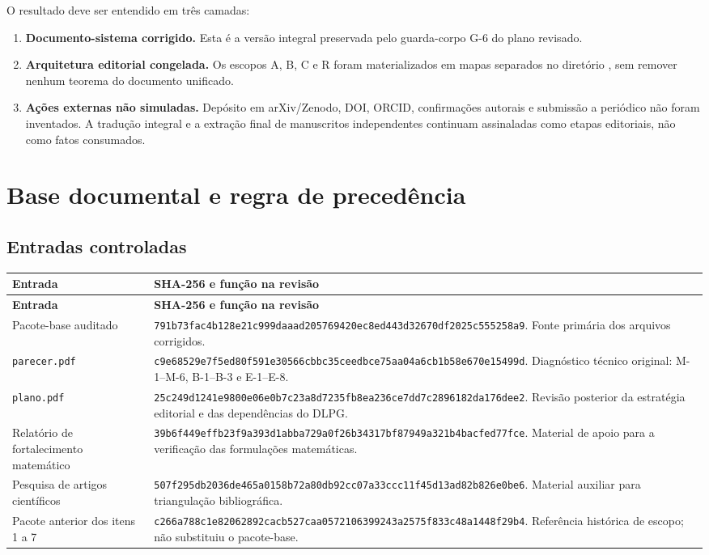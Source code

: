 \documentclass[11pt,a4paper]{article}
\begin{document}
O resultado deve ser entendido em três camadas:

\begin{enumerate}
  \item \textbf{Documento-sistema corrigido.} Esta é a versão integral preservada pelo
  guarda-corpo G-6 do plano revisado.
  \item \textbf{Arquitetura editorial congelada.} Os escopos A, B, C e R foram
  materializados em mapas separados no diretório , sem remover nenhum
  teorema do documento unificado.
  \item \textbf{Ações externas não simuladas.} Depósito em arXiv/Zenodo, DOI, ORCID,
  confirmações autorais e submissão a periódico não foram inventados. A tradução integral e
  a extração final de manuscritos independentes continuam assinaladas como etapas
  editoriais, não como fatos consumados.
\end{enumerate}

\section{Base documental e regra de precedência}

\subsection{Entradas controladas}

\begin{longtable}{L{0.29\textwidth}L{0.58\textwidth}}
\toprule
\textbf{Entrada} & \textbf{SHA-256 e função na revisão}\\
\midrule
\endfirsthead
\toprule
\textbf{Entrada} & \textbf{SHA-256 e função na revisão}\\
\midrule
\endhead
Pacote-base auditado &
\nolinkurl{791b73fac4b128e21c999daaad205769420ec8ed443d32670df2025c555258a9}. Fonte
primária dos arquivos corrigidos.\\
\texttt{parecer.pdf} &
\nolinkurl{c9e68529e7f5ed80f591e30566cbbc35ceedbce75aa04a6cb1b58e670e15499d}.
Diagnóstico técnico original: M-1--M-6, B-1--B-3 e E-1--E-8.\\
\texttt{plano.pdf} &
\nolinkurl{25c249d1241e9800e06e0b7c23a8d7235fb8ea236ce7dd7c2896182da176dee2}.
Revisão posterior da estratégia editorial e das dependências do DLPG.\\
Relatório de fortalecimento matemático &
\nolinkurl{39b6f449effb23f9a393d1abba729a0f26b34317bf87949a321b4bacfed77fce}.
Material de apoio para a verificação das formulações matemáticas.\\
Pesquisa de artigos científicos &
\nolinkurl{507f295db2036de465a0158b72a80db92cc07a33ccc11f45d13ad82b826e0be6}.
Material auxiliar para triangulação bibliográfica.\\
Pacote anterior dos itens 1 a 7 &
\nolinkurl{c266a788c1e82062892cacb527caa0572106399243a2575f833c48a1448f29b4}.
Referência histórica de escopo; não substituiu o pacote-base.\\
\bottomrule
\end{longtable}
\end{document}
